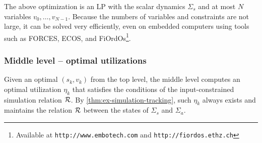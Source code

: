 The above optimization is an LP with the scalar dynamics $\Sigma_{s}$ and at most $N$ variables $v_{0},\dots,v_{N-1}$.
Because the numbers of variables and constraints are not large, it can be solved very efficiently, even on embedded computers using tools such as FORCES, ECOS, and FiOrdOs\footnote{Available at \texttt{http://www.embotech.com} and \texttt{http://fiordos.ethz.ch}}.


\subsubsection{Middle level -- optimal utilizations}

Given an optimal $(s_{k}, v_{k})$ from the top level, the middle level computes an optimal utilization $\eta_{k}$ that satisfies the conditions of the input-constrained simulation relation $\mathcal{R}$.
By \cref{thm:ex-simulation-tracking}, such $\eta_{k}$ always exists and maintains the relation $\mathcal{R}$ between the states of $\Sigma_{s}$ and $\Sigma_{a}$.


